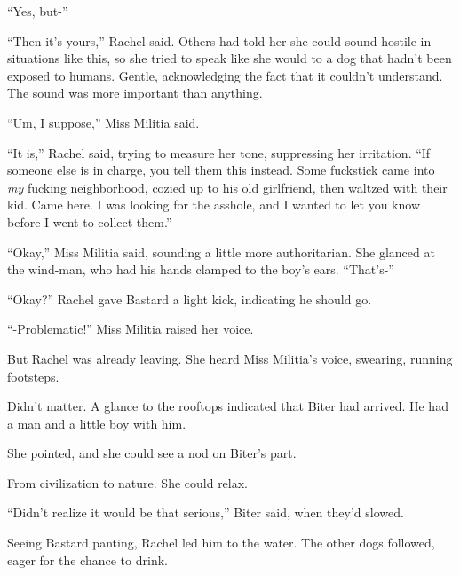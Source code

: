 ``Yes, but-''



``Then it's yours,'' Rachel said.  Others had told her she could sound hostile in situations like this, so she tried to speak like she would to a dog that hadn't been exposed to humans.  Gentle, acknowledging the fact that it couldn't understand.  The sound was more important than anything.



``Um, I suppose,'' Miss Militia said.



``It is,'' Rachel said, trying to measure her tone, suppressing her irritation.  ``If someone else is in charge, you tell them this instead.  Some fuckstick came into \emph{my} fucking neighborhood, cozied up to his old girlfriend, then waltzed with their kid.  Came here.  I was looking for the asshole, and I wanted to let you know before I went to collect them.''



``Okay,'' Miss Militia said, sounding a little more authoritarian.  She glanced at the wind-man, who had his hands clamped to the boy's ears.  ``That's-''



``Okay?''  Rachel gave Bastard a light kick, indicating he should go.



``-Problematic!''  Miss Militia raised her voice.



But Rachel was already leaving.  She heard Miss Militia's voice, swearing, running footsteps.



Didn't matter.  A glance to the rooftops indicated that Biter had arrived.  He had a man and a little boy with him.



She pointed, and she could see a nod on Biter's part.



\blacksquare



From civilization to nature.  She could relax.



``Didn't realize it would be that serious,'' Biter said, when they'd slowed.



Seeing Bastard panting, Rachel led him to the water.  The other dogs followed, eager for the chance to drink.




